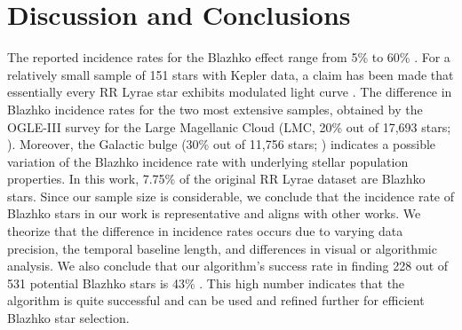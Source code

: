 
\section{Discussion and Conclusions\label{sec:discussion}}






The reported incidence rates for the Blazhko effect
range from 5\% \citep{2007MNRAS.377.1263S} to 60\% \citep{2014A&A...570A.100S}. For a relatively small sample of
151 stars with Kepler data, a claim has been made that essentially every RR Lyrae star exhibits modulated light curve
\citep{2018A&A...614L...4K}. The difference in Blazhko incidence rates for the two most extensive samples, obtained
by the OGLE-III survey for the Large Magellanic Cloud (LMC, 20\% out of 17,693 stars; \citealt{2009AcA....59....1S}).
Moreover, the Galactic bulge (30\% out of 11,756 stars; \citealt{2011AcA....61....1S}) indicates a possible variation of
the Blazhko incidence rate with underlying stellar population properties. In this work, 7.75\% of the original RR Lyrae dataset are Blazhko stars. Since our sample size is considerable, we conclude that the incidence rate of Blazhko stars in our work is representative and aligns with other works. We theorize that the difference in incidence rates occurs due to varying data precision, the temporal baseline length, and differences in visual or algorithmic analysis.
We also conclude that our algorithm's success rate in finding 228 out of 531 potential Blazhko stars is 43\% . This high number indicates that the algorithm is quite successful and can be used and refined further for efficient Blazhko star selection. 

